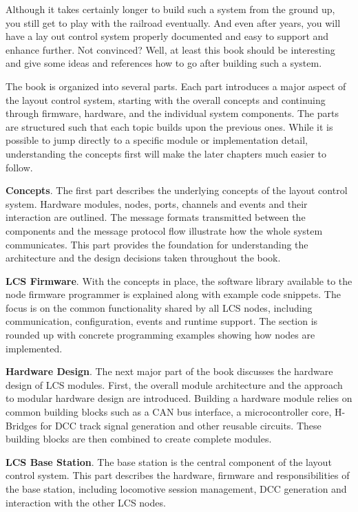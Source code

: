 Although it takes certainly longer to build such a system from the ground up, you still get to play with the railroad eventually. And even after years, you will have a lay  out control system properly documented and easy to support and enhance further. Not convinced? Well, at least this book should be interesting and give some ideas and references how to go after building such a system.


The book is organized into several parts. Each part introduces a major aspect of the layout control system, starting with the overall concepts and continuing through firmware, hardware, and the individual system components. The parts are structured such that each topic builds upon the previous ones. While it is possible to jump directly to a specific module or implementation detail, understanding the concepts first will make the later chapters much easier to follow.

\textbf{Concepts}. The first part describes the underlying concepts of the layout control system. Hardware modules, nodes, ports, channels and events and their interaction are outlined. The message formats transmitted between the components and the message protocol flow illustrate how the whole system communicates. This part provides the foundation for understanding the architecture and the design decisions taken throughout the book.

\textbf{LCS Firmware}. With the concepts in place, the software library available to the node firmware programmer is explained along with example code snippets. The focus is on the common functionality shared by all LCS nodes, including communication, configuration, events and runtime support. The section is rounded up with concrete programming examples showing how nodes are implemented.

\textbf{Hardware Design}. The next major part of the book discusses the hardware design of LCS modules. First, the overall module architecture and the approach to modular hardware design are introduced. Building a hardware module relies on common building blocks such as a CAN bus interface, a microcontroller core, H-Bridges for DCC track signal generation and other reusable circuits. These building blocks are then combined to create complete modules.

\textbf{LCS Base Station}. The base station is the central component of the layout control system. This part describes the hardware, firmware and responsibilities of the base station, including locomotive session management, DCC generation and interaction with the other LCS nodes.

